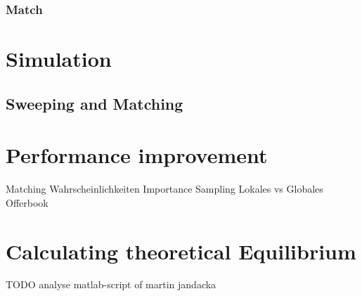 \documentclass[Bachelorarbeit.tex]{subfiles}
\begin{document}
\subsubsection{Match}

\section{Simulation}
\subsection{Sweeping and Matching}

\section{Performance improvement}
Matching Wahrscheinlichkeiten
Importance Sampling
Lokales vs Globales Offerbook
		
\section{Calculating theoretical Equilibrium}
TODO analyse matlab-script of martin jandacka
\end{document}
